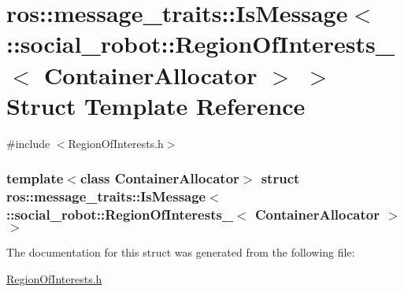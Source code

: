 \hypertarget{structros_1_1message__traits_1_1IsMessage_3_01_1_1social__robot_1_1RegionOfInterests___3_01ContainerAllocator_01_4_01_4}{
\section{ros::message\_\-traits::IsMessage$<$ ::social\_\-robot::RegionOfInterests\_\-$<$ ContainerAllocator $>$ $>$ Struct Template Reference}
\label{structros_1_1message__traits_1_1IsMessage_3_01_1_1social__robot_1_1RegionOfInterests___3_01ContainerAllocator_01_4_01_4}
}


{\ttfamily \#include $<$RegionOfInterests.h$>$}

\subsubsection*{template$<$class ContainerAllocator$>$ struct ros::message\_\-traits::IsMessage$<$ ::social\_\-robot::RegionOfInterests\_\-$<$ ContainerAllocator $>$ $>$}



The documentation for this struct was generated from the following file:\begin{DoxyCompactItemize}
\item 
\hyperlink{RegionOfInterests_8h}{RegionOfInterests.h}\end{DoxyCompactItemize}
